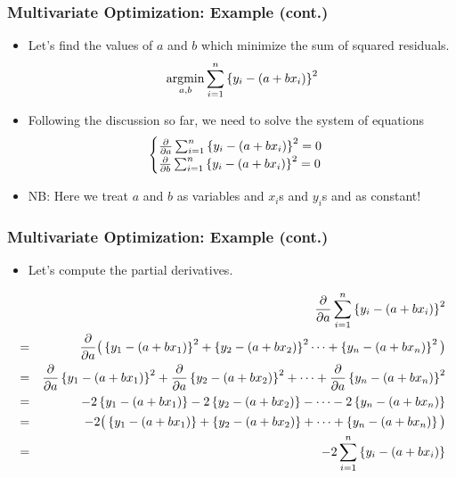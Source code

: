 \documentclass[pdflatex, 12pt]{beamer}
\begin{document}
\begin{frame}
\frametitle{Multivariate Optimization: Example (cont.)}
\begin{itemize}
\item Let's find the values of $a$ and $b$ which minimize the sum of squared residuals.
 \begin{equation}
 \operatorname*{argmin}_{a, b} \sum_{i = 1}^{n} \left\{y_i - (a + bx_i)\right\}^2 \notag
 \end{equation}
\item Following the discussion so far, we need to solve the system of equations
 \begin{eqnarray}
 \begin{cases}
 \frac{\partial}{\partial a} \sum_{i = 1}^{n} \left\{y_i - (a + bx_i)\right\}^2 = 0 \\
 \frac{\partial}{\partial b} \sum_{i = 1}^{n} \left\{y_i - (a + bx_i)\right\}^2 = 0 \notag
 \end{cases}
 \end{eqnarray}
\item NB: Here we treat $a$ and $b$ as variables and $x_i$s and $y_i$s and as constant!
\end{itemize}
\end{frame}

\begin{frame}
\frametitle{Multivariate Optimization: Example (cont.)}
\begin{itemize}
\item Let's compute the partial derivatives.
\end{itemize}
{\footnotesize
\begin{eqnarray}
&& \frac{\partial}{\partial a} \sum_{i = 1}^{n} \left\{y_i - (a + bx_i)\right\}^2 \notag \\
&=& \frac{\partial}{\partial a} \big(\left\{y_1 - (a + bx_1)\right\}^2 + \left\{y_2 - (a + bx_2)\right\}^2 \cdots + \left\{y_n - (a + bx_n)\right\}^2 \big) \notag \\
&=& \frac{\partial}{\partial a} \left\{y_1 - (a + bx_1)\right\}^2 + \frac{\partial}{\partial a} \left\{y_2 - (a + bx_2)\right\}^2 + \cdots + \frac{\partial}{\partial a} \left\{y_n - (a + bx_n)\right\}^2 \notag \\
&=& -2\left\{y_1 - (a + bx_1)\right\} - 2\left\{y_2 - (a + bx_2)\right\} - \cdots - 2\left\{y_n - (a + bx_n)\right\} \notag \\
&=& -2\big(\left\{y_1 - (a + bx_1)\right\} + \left\{y_2 - (a + bx_2)\right\} + \cdots + \left\{y_n - (a + bx_n)\right\}\big) \notag \\
&=& -2 \sum_{i = 1}^{n} \left\{y_i - (a + bx_i)\right\} \notag
\end{eqnarray}
}
\end{frame}
\end{document}
